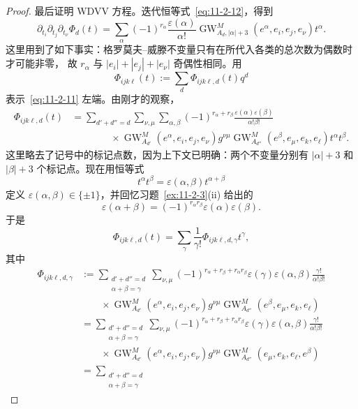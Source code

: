 \begin{proof}
最后证明 WDVV 方程。迭代恒等式~\eqref{eq:11-2-12}，得到
\[
  \partial_{t_i}\partial_{t_j}\partial_{t_\nu}\Phi_d(t)
  =
  \sum_\alpha(-1)^{r_\alpha}
  \frac{\varepsilon(\alpha)}{\alpha!}
  \operatorname{GW}_{A_d,|\alpha|+3}^M
  (e^\alpha,e_i,e_j,e_\nu)t^\alpha.
\]
这里用到了如下事实：格罗莫夫--威滕不变量只有在所代入各类的总次数为偶数时才可能非零，
故 $r_\alpha$ 与 $|e_i|+|e_j|+|e_\nu|$ 奇偶性相同。用
\[
  \Phi_{ijk\ell}(t):=\sum_d\Phi_{ijk\ell,d}(t)q^d
\]
表示~\eqref{eq:11-2-11} 左端。由刚才的观察，
\[
\begin{aligned}
  \Phi_{ijk\ell,d}(t)
  &=
  \sum_{d'+d''=d}\sum_{\nu,\mu}\sum_{\alpha,\beta}
  (-1)^{r_\alpha+r_\beta}
  \frac{\varepsilon(\alpha)\varepsilon(\beta)}{\alpha!\beta!}\\
  &\qquad\qquad{}\times
  \operatorname{GW}_{A_{d'}}^M(e^\alpha,e_i,e_j,e_\nu)g^{\nu\mu}
  \operatorname{GW}_{A_{d''}}^M(e^\beta,e_\mu,e_k,e_\ell)t^\alpha t^\beta.
\end{aligned}
\]
这里略去了记号中的标记点数，因为上下文已明确：两个不变量分别有 $|\alpha|+3$ 和
$|\beta|+3$ 个标记点。现在用恒等式
\[
  t^\alpha t^\beta=\varepsilon(\alpha,\beta)t^{\alpha+\beta}
\]
定义 $\varepsilon(\alpha,\beta)\in\{\pm1\}$，并回忆习题~\ref{ex:11-2-3}(ii) 给出的
\[
  \varepsilon(\alpha+\beta)
  =(-1)^{r_\alpha r_\beta}\varepsilon(\alpha)\varepsilon(\beta).
\]
于是
\[
  \Phi_{ijk\ell,d}(t)=\sum_\gamma\frac1{\gamma!}
  \Phi_{ijk\ell,d,\gamma}t^\gamma,
\]
其中
\[
\begin{aligned}
  \Phi_{ijk\ell,d,\gamma}
  &:=
  \sum_{\substack{d'+d''=d\\ \alpha+\beta=\gamma}}
  \sum_{\nu,\mu}
  (-1)^{r_\alpha+r_\beta+r_\alpha r_\beta}
  \varepsilon(\gamma)\varepsilon(\alpha,\beta)
  \frac{\gamma!}{\alpha!\beta!}\\
  &\qquad{}\times
  \operatorname{GW}_{A_{d'}}^M(e^\alpha,e_i,e_j,e_\nu)g^{\nu\mu}
  \operatorname{GW}_{A_{d''}}^M(e^\beta,e_\mu,e_k,e_\ell)\\
  &=
  \sum_{\substack{d'+d''=d\\ \alpha+\beta=\gamma}}
  \sum_{\nu,\mu}
  (-1)^{r_\alpha+r_\beta+r_\alpha r_\beta}
  \varepsilon(\gamma)\varepsilon(\alpha,\beta)
  \frac{\gamma!}{\alpha!\beta!}\\
  &\qquad{}\times
  \operatorname{GW}_{A_{d'}}^M(e^\alpha,e_i,e_j,e_\nu)g^{\nu\mu}
  \operatorname{GW}_{A_{d''}}^M(e_\mu,e_k,e_\ell,e^\beta)\\
  &=
  \sum_{\substack{d'+d''=d\\ \alpha+\beta=\gamma}}

\end{aligned}\]
\end{proof}
